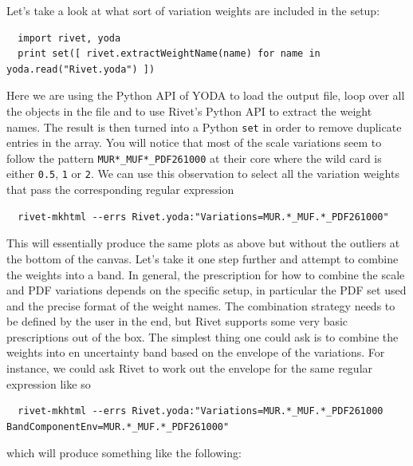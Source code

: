\documentclass[10pt,fleqn]{scrartcl}
\theoremstyle{exstyle}
\begin{document}
Let's take a look at what sort of variation weights are included in the setup:
\begin{verbatim}
  import rivet, yoda
  print set([ rivet.extractWeightName(name) for name in yoda.read("Rivet.yoda") ])
\end{verbatim}
Here we are using the Python API of YODA to load the output file, loop over all
the objects in the file and to use Rivet's Python API to extract the weight names.
The result is then turned into a Python \verb|set| in order to remove duplicate entries in the array.
You will notice that most of the scale variations
seem to follow the pattern \verb|MUR*_MUF*_PDF261000| at their core where the wild card is either \verb|0.5|,
\verb|1| or \verb|2|. We can use this observation to select all the variation weights
that pass the corresponding regular expression
\begin{verbatim}
  rivet-mkhtml --errs Rivet.yoda:"Variations=MUR.*_MUF.*_PDF261000"
\end{verbatim}
This will essentially produce the same plots as above but without the outliers
at the bottom of the canvas. Let's take it one step further and attempt to combine
the weights into a band. In general, the prescription for how to combine the
scale and PDF variations depends on the specific setup, 
in particular the PDF set used and the precise format of the weight names.
The combination strategy needs to be defined by the user in the end, but Rivet
supports some very basic prescriptions out of the box. 
The simplest thing one could ask is to combine the weights into en uncertainty band
based on the envelope of the variations. For instance, we could ask Rivet to work out
the envelope for the same regular expression like so
\begin{footnotesize}
\begin{verbatim}
  rivet-mkhtml --errs Rivet.yoda:"Variations=MUR.*_MUF.*_PDF261000 BandComponentEnv=MUR.*_MUF.*_PDF261000"
\end{verbatim}
\end{footnotesize}
which will produce something like the following:
\end{document}
